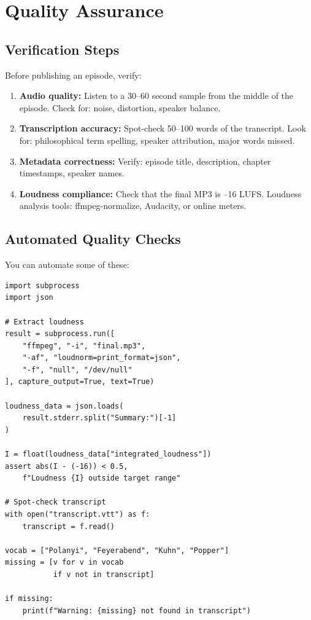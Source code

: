 \documentclass[11pt,letterpaper]{article}
\begin{document}
\vspace{12pt}

\section{Quality Assurance}

\subsection{Verification Steps}

Before publishing an episode, verify:

\begin{enumerate}
  \item \textbf{Audio quality:} Listen to a 30–60 second sample from the middle of the episode. Check for: noise, distortion, speaker balance.
  \item \textbf{Transcription accuracy:} Spot-check 50–100 words of the transcript. Look for: philosophical term spelling, speaker attribution, major words missed.
  \item \textbf{Metadata correctness:} Verify: episode title, description, chapter timestamps, speaker names.
  \item \textbf{Loudness compliance:} Check that the final MP3 is –16 LUFS. Loudness analysis tools: ffmpeg-normalize, Audacity, or online meters.
\end{enumerate}

\subsection{Automated Quality Checks}

You can automate some of these:

\begin{verbatim}
import subprocess
import json

# Extract loudness
result = subprocess.run([
    "ffmpeg", "-i", "final.mp3",
    "-af", "loudnorm=print_format=json",
    "-f", "null", "/dev/null"
], capture_output=True, text=True)

loudness_data = json.loads(
    result.stderr.split("Summary:")[-1]
)

I = float(loudness_data["integrated_loudness"])
assert abs(I - (-16)) < 0.5,
    f"Loudness {I} outside target range"

# Spot-check transcript
with open("transcript.vtt") as f:
    transcript = f.read()

vocab = ["Polanyi", "Feyerabend", "Kuhn", "Popper"]
missing = [v for v in vocab
           if v not in transcript]

if missing:
    print(f"Warning: {missing} not found in transcript")
\end{verbatim}
\end{document}
